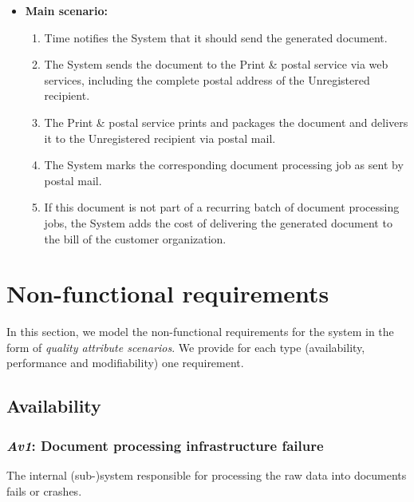\documentclass[a4paper,10pt]{article}
\begin{document}
\begin{itemize}
    \item \textbf{Main scenario:} 
    \begin{enumerate}
       \item Time notifies the System that it should send the generated document.
       \item The System sends the document to the Print \& postal service via web services, including the complete postal address of the Unregistered recipient.
       \item The Print \& postal service prints and packages the document and delivers it to the Unregistered recipient via postal mail. 
       \item The System marks the corresponding document processing job as sent by postal mail.
       \item If this document is not part of a recurring batch of document processing jobs, the System adds the cost of delivering the generated document to the bill of the customer organization.
    \end{enumerate}
\end{itemize}



\section{Non-functional requirements}\label{sec:non-functional}
In this section, we model the non-functional requirements for the system in the
form of \emph{quality attribute scenarios}. We provide for each type
(availability, performance and modifiability) one requirement.

\subsection{Availability}
\subsubsection{\emph{Av1}: Document processing infrastructure failure}
The internal (sub-)system responsible for processing the raw data into documents fails or crashes.
\end{document}
